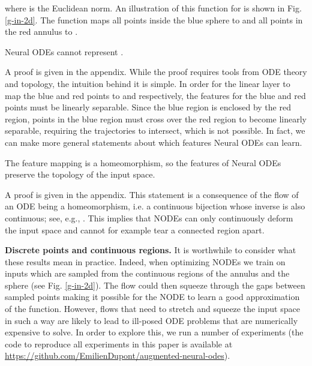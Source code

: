 \documentclass{article}
\begin{document}
where  is the Euclidean norm. An illustration of this function for  is shown in Fig. \ref{g-in-2d}. The function maps all points inside the blue sphere to  and all points in the red annulus to . 

\begin{prop}
Neural ODEs cannot represent .
\end{prop}

A proof is given in the appendix. While the proof requires tools from ODE theory and topology, the intuition behind it is simple. In order for the linear layer to map the blue and red points to  and  respectively, the features  for the blue and red points must be linearly separable. Since the blue region is enclosed by the red region, points in the blue region must cross over the red region to become linearly separable, requiring the trajectories to intersect, which is not possible. In fact, we can make more general statements about which features Neural ODEs can learn.

\begin{prop}
The feature mapping  is a homeomorphism, so the features of Neural ODEs preserve the topology of the input space.
\end{prop}

A proof is given in the appendix. This statement is a consequence of the flow of an ODE being a homeomorphism, i.e. a continuous bijection whose inverse is also continuous; see, e.g., \citep{younes2010shapes}. This implies that NODEs can only continuously deform the input space and cannot for example tear a connected region apart.

\textbf{Discrete points and continuous regions.} It is worthwhile to consider what these results mean in practice. Indeed, when optimizing NODEs we train on inputs which are sampled from the continuous regions of the annulus and the sphere (see Fig. \ref{g-in-2d}). The flow could then squeeze through the gaps between sampled points making it possible for the NODE to learn a good approximation of the function. However, flows that need to stretch and squeeze the input space in such a way are likely to lead to ill-posed ODE problems that are numerically expensive to solve. In order to explore this, we run a number of experiments (the code to reproduce all experiments in this paper is available at \url{https://github.com/EmilienDupont/augmented-neural-odes}).
\end{document}
